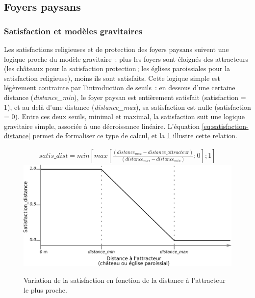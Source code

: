 %	
	
\subsection{Foyers paysans}

	\subsubsection{Satisfaction et modèles gravitaires \label{sssec:satisfaction}}
	
Les satisfactions religieuses et de protection des foyers paysans suivent une logique proche du modèle gravitaire : plus les foyers sont éloignés des \og attracteurs\fg{} (les châteaux pour la satisfaction \og protection\fg{} ; les églises paroissiales pour la satisfaction religieuse), moins ils sont satisfaits.
Cette logique simple est légèrement contrainte par l'introduction de seuils :
	 en dessous d'une certaine distance (\textit{distance\_min}), le foyer paysan est entièrement satisfait (satisfaction = 1), et au delà d'une distance (\textit{distance\_max}), sa satisfaction est nulle (satisfaction = 0).
Entre ces deux seuils, minimal et maximal, la satisfaction suit une logique gravitaire simple, associée à une décroissance linéaire.
L'équation \ref{eq:satisfaction-distance} permet de formaliser ce type de calcul, et la \cref{fig:satisfaction-distance} illustre cette relation.

\begin{figure}[H]
	\centering
	\begin{equation}\label{eq:satisfaction-distance}
	\begin{gathered}
	satis\_dist = min \left \lbrack max \left \lbrack \frac{(distance_{max} - distance\_attracteur)}{(distance_{max} -distance_{min})}; 0 \right \rbrack ; 1 \right \rbrack
	\end{gathered}
	\end{equation}
	\includegraphics[width=.8\linewidth]{img/satisfaction_distance.pdf}
	\caption{Variation de la satisfaction en fonction de la distance à l'attracteur le plus proche.}
	\label{fig:satisfaction-distance}
\end{figure}

